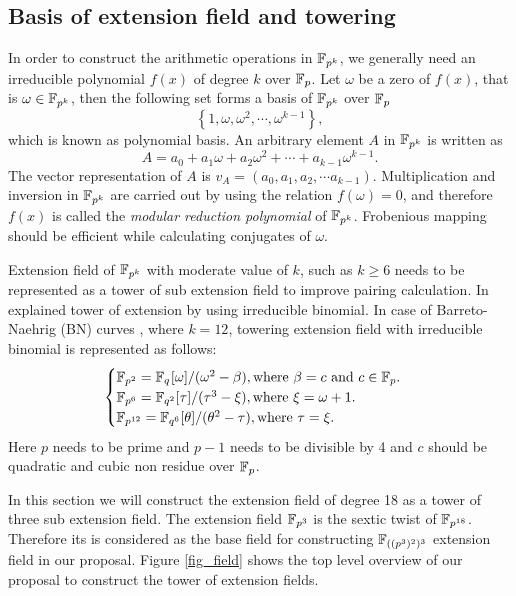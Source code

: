 \subsection{Basis of extension field and towering}
In order to construct the arithmetic operations in $\mathbb{F}_{p^k}$, we generally need an irreducible polynomial $f(x)$ of degree $k$ over $\mathbb{F}_p$. Let $\omega$ be a zero of $f(x)$, that is $\omega \in \mathbb{F}_{p^k}$, then the following set forms a basis of  $\mathbb{F}_{p^k}$ over $\mathbb{F}_p$
\begin{equation}\label{basis_fpm}
\left\lbrace 1, \omega, \omega^2 , \cdots, \omega^{k-1} \right\rbrace,
\end{equation}
which is known as polynomial basis. An arbitrary element $A$ in  $\mathbb{F}_{p^k}$ is written as
\begin{equation}\label{element_fpm}
A = a_0 +a_1\omega + a_2\omega^2 + \cdots + a_{k-1}\omega^{k-1}. 
\end{equation}
The vector representation of $A$ is   $v_A =(a_0, a_1, a_2, \cdots a_{k-1})$. Multiplication and inversion in  $\mathbb{F}_{p^k}$ are carried out by using the relation $f(\omega) = 0$, and therefore $f(x)$ is called the \textit{modular reduction polynomial} of  $\mathbb{F}_{p^k}$. Frobenious mapping should be efficient while calculating conjugates of $\omega$. 

Extension field of $\mathbb{F}_{p^k}$ with moderate value of $k$, such as $k \geq 6$ needs to be represented as a tower of sub extension field to improve pairing calculation. In \cite{lane2008draft}  explained tower of extension by using irreducible binomial. In case of Barreto-Naehrig (BN) curves  \cite{BN}, where $k=12$, towering extension field with irreducible binomial is represented as follows:
\begin{equation}\label{eq:BN_towering}
\begin{cases}
{\mathbb{F}}_{p^{2}} = {\mathbb{F}}_{q^{}}[\omega]/(\omega^2-\beta), \mbox{where $\beta = c$ and $c \in \mathbb{F}_p$}.\nonumber \\ 
{\mathbb{F}}_{p^{6}} = {\mathbb{F}}_{q^{2}}[\tau]/(\tau^3-\xi), \mbox{where $\xi = \omega+1$}.\nonumber \\ 
{\mathbb{F}}_{p^{12}} = {\mathbb{F}}_{q^{6}}[\theta]/(\theta^2-\tau),\mbox{where $\tau = \xi$}. \nonumber \\ 
\end{cases}
\end{equation}
Here $p$ needs to be prime and $p-1$ needs to be divisible by 4 and $c$ should be quadratic and cubic non residue over $\mathbb{F}_p$.

In this section we will construct the extension field of degree 18 as a tower of three sub extension field. The extension field $\mathbb{F}_{p^3}$ is the sextic twist of $\mathbb{F}_{p^{18}}$. Therefore its is considered as the base field for constructing $\mathbb{F}_{((p^3)^2)^3}$ extension field in our proposal. Figure \ref{fig_field} shows the top level overview of our proposal to construct the tower of extension fields.

